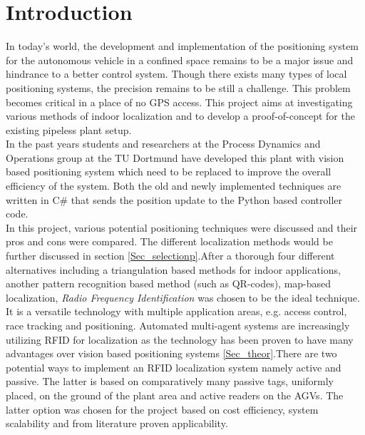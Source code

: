 \section{Introduction}

In today\textquoteright s world, the development and implementation of the positioning system for the autonomous vehicle in a confined space remains to be a major issue and hindrance to a better control system. Though there exists many types of local positioning systems, the precision remains to be still a challenge. This problem becomes critical in a place of no GPS access.
This project aims at investigating various methods of indoor localization and to develop a proof-of-concept for the existing pipeless plant setup. \\

In the past years students and researchers at the Process Dynamics and Operations group at the TU Dortmund have developed this plant with vision based positioning system which need to be replaced to improve the overall efficiency of the system. Both the old and newly implemented techniques are written in C\# that sends the position update to the Python based controller code.\\

In this project, various potential positioning techniques were discussed and their pros and cons were compared. The different localization methods would be further discussed in section \ref{Sec_selectionp}.After a thorough four different alternatives including a triangulation based methods for indoor applications, another pattern recognition based method (such as QR-codes), map-based localization, \textit{Radio Frequency Identification} was chosen to be the ideal technique. It is a versatile technology with multiple application areas, e.g. access control, race tracking and positioning. Automated multi-agent systems are increasingly utilizing RFID for localization as the technology has been proven to have many advantages over vision based positioning systems \ref{Sec_theor}.There are two potential ways to implement an RFID localization system namely active and passive. The latter is based on comparatively many passive tags, uniformly placed, on the ground of the plant area and active readers on the AGVs. The latter option was chosen for the project based on cost efficiency, system scalability and from literature proven applicability. \\

